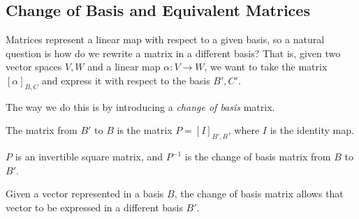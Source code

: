     


\subsection{Change of Basis and Equivalent Matrices}

Matrices represent a linear map with respect to a given basis, so a natural question is how do we rewrite a matrix in a different basis? That is, 
given two vector spaces $V, W$ and a linear map $\alpha: V \rightarrow W$, we want to take the matrix $[\alpha]_{B, C}$ and express it with respect to the basis $B', C'$. 

The way we do this is by introducing a \emph{change of basis} matrix.

\begin{definition}    
    The  matrix from $B'$ to $B$ is the matrix
    $P = [I]_{B', B}$, where $I$ is the identity map.
\end{definition}
\begin{remark}
    $P$ is an invertible square matrix, and $P^{-1}$ is the change of basis matrix from $B$ to $B'$. 
\end{remark}

Given a vector represented in a basis $B$, the change of basis matrix allows that vector to be expressed in a different basis $B'$.

